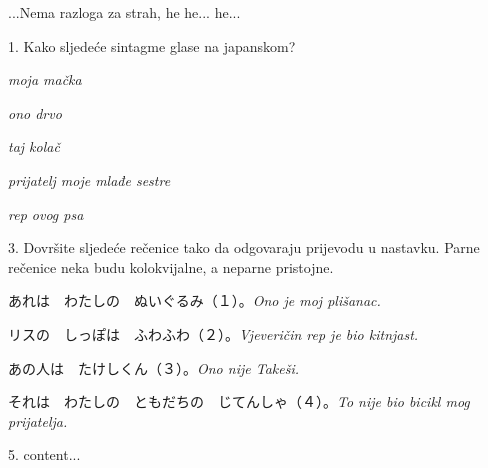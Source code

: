 
\author{Marko Miličić, Tomislav Mamić}

	
	...Nema razloga za strah, he he... he...
	
	\begin{mondai}{1. Kako sljedeće sintagme glase na japanskom?}
		\item \textit{moja mačka}
		\item \textit{ono drvo}
		\item \textit{taj kolač}
		\item \textit{prijatelj moje mlađe sestre}
		\item \textit{rep ovog psa}
	\end{mondai}

	\begin{mondai}{3. Dovršite sljedeće rečenice tako da odgovaraju prijevodu u nastavku. Parne rečenice neka budu kolokvijalne, a neparne pristojne.}
		\item あれは　わたしの　ぬいぐるみ（１）。\textit{Ono je moj plišanac.}
		\item リスの　しっぽは　ふわふわ（２）。\textit{Vjeveričin rep je bio kitnjast.}
		\item あの人は　たけしくん（３）。\textit{Ono nije Takeši.}
		\item それは　わたしの　ともだちの　じてんしゃ（４）。\textit{To nije bio bicikl mog prijatelja.}
	\end{mondai}

	\begin{mondai}{5. }
		content...
	\end{mondai}
